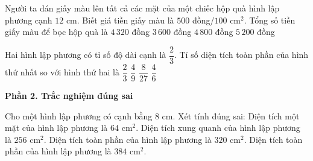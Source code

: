 \begin{ex} %
Người ta dán giấy màu lên tất cả các mặt của một chiếc hộp quà hình lập phương cạnh $12\text{ cm}$. Biết giá tiền giấy màu là $500$ đồng/$100\text{ cm}^2$. Tổng số tiền giấy màu để bọc hộp quà là
\choice
{\True $4\,320$ đồng}
{$3\,600$ đồng}
{$4\,800$ đồng}
{$5\,200$ đồng}
\end{ex}

\begin{ex} %
Hai hình lập phương có tỉ số độ dài cạnh là $\dfrac{2}{3}$. Tỉ số diện tích toàn phần của hình thứ nhất so với hình thứ hai là
\choice
{$\dfrac{2}{3}$}
{\True $\dfrac{4}{9}$}
{$\dfrac{8}{27}$}
{$\dfrac{4}{6}$}
\end{ex}

\textbf{Phần 2. Trắc nghiệm đúng sai}

\begin{ex} %
Cho một hình lập phương có cạnh bằng $8\text{ cm}$. Xét tính đúng sai:
\choiceTF
{\True Diện tích một mặt của hình lập phương là $64\text{ cm}^2$.}
{\True Diện tích xung quanh của hình lập phương là $256\text{ cm}^2$.}
{Diện tích toàn phần của hình lập phương là $320\text{ cm}^2$.}
{\True Diện tích toàn phần của hình lập phương là $384\text{ cm}^2$.}
\end{ex}

